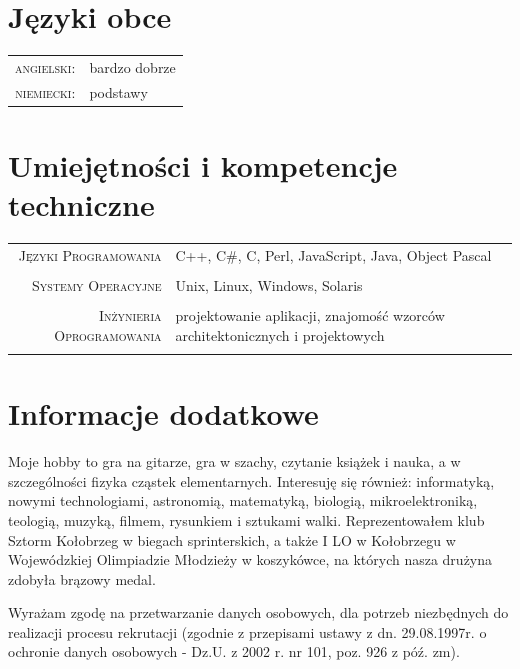 \documentclass[a4paper,10pt]{article}
\begin{document}
\section{Języki obce}
\begin{tabular}{rl}
	\textsc{angielski:}&bardzo dobrze\\
	\textsc{niemiecki:}&podstawy\\
\end{tabular}

\section{Umiejętności i kompetencje techniczne}
\begin{tabular}{rl}
	\textsc{Języki Programowania}
	&\footnotesize{C++, C\#, C, Perl, JavaScript, Java, Object Pascal} \\
    \multicolumn{2}{c}{} \\
        
    \textsc{Systemy Operacyjne}
    &\footnotesize{Unix, Linux, Windows, Solaris} \\
    \multicolumn{2}{c}{} \\

    \textsc{Inżynieria Oprogramowania}
    &\footnotesize{projektowanie aplikacji, znajomość wzorców architektonicznych i projektowych} \\
    \multicolumn{2}{c}{} \\        
\end{tabular}
	
\section{Informacje dodatkowe}
	Moje hobby to gra na gitarze, gra w szachy, czytanie książek i nauka, a w szczególności fizyka cząstek elementarnych. Interesuję 
	się również: informatyką, nowymi technologiami, astronomią, matematyką, biologią, mikroelektroniką, teologią, muzyką, filmem, 
	rysunkiem i sztukami walki. Reprezentowałem klub Sztorm Kołobrzeg w biegach sprinterskich, a także I LO w Kołobrzegu w Wojewódzkiej 
	Olimpiadzie Młodzieży w koszykówce, na których nasza drużyna zdobyła brązowy medal.
        
    \vfill{}

    \begin{center}
    {\scriptsize Wyrażam zgodę na przetwarzanie danych osobowych, dla potrzeb niezbędnych do realizacji procesu rekrutacji (zgodnie z 
    przepisami ustawy z dn. 29.08.1997r. o ochronie danych osobowych - Dz.U. z 2002 r. nr 101, poz. 926 z póź. zm).}
    \end{center}
	
\end{document}
